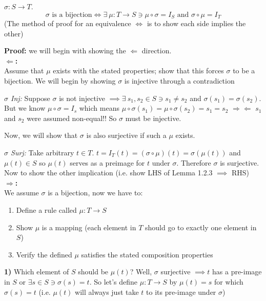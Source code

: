 \begin{lemma}
$\sigma :S \rightarrow T$.
\begin{equation}
    \sigma \text{ is a bijection} \iff \exists \ \mu: T\rightarrow S \ni \mu\circ \sigma = I_S \text{ and } \sigma\circ \mu = I_T\nonumber
\end{equation}
(The method of proof for an equivalence $\Leftrightarrow$ is to show each side implies the
other)\steezybreak

\noindent \textbf{Proof:} we will begin with showing the $\Leftarrow$ direction.\\
\textbf{$\Leftarrow$:} \\Assume that $\mu$ exists with the stated properties; show that this forces
$\sigma$ to be a bijection. We will begin by showing $\sigma$ is injective through a contradiction
\steezybreak

\noindent \textit{$\sigma$ Inj:} Suppose $\sigma$ is not injective
$\implies \exists \ s_1,s_2\in S \ni s_1\neq s_2$ and $\sigma(s_1)=\sigma(s_2)$. But we know
$\mu \circ \sigma = I_s$ which means $\mu\circ \sigma (s_1) = \mu\circ \sigma(s_2) = s_1=s_2$
$\Rightarrow\Leftarrow$ $s_1$ and $s_2$ were assumed non-equal!! So $\sigma$ must be
injective.\steezybreak

\noindent Now, we will show that $\sigma$ is also surjective if such a $\mu$ exists.\steezybreak

\noindent \textit{$\sigma$ Surj:} Take arbitrary $t\in T$.
$t= I_T(t)= (\sigma\circ\mu)(t)=\sigma(\mu(t))$ and $\mu(t)\in S$ so $\mu(t)$ serves as a preimage
for $t$ under $\sigma$. Therefore $\sigma$ is surjective. \\

\noindent Now to show the other implication (i.e. show LHS of Lemma 1.2.3 $\implies$ RHS) \\
\textbf{$\Rightarrow$:} \\ We assume $\sigma$ is a bijection, now we have to:
\begin{enumerate}
    \item Define a rule called $\mu:T\rightarrow S$
    \item Show $\mu$ is a mapping (each element in $T$ should go to exactly one element in $S$)
    \item Verify the defined $\mu$ satisfies the stated composition properties
\end{enumerate}
\textbf{1)} Which element of $S$ should be $\mu(t)$? Well, $\sigma$ surjective $\implies t$ has a
pre-image in $S$ or $\exists s\in S \ni \sigma(s)=t$. So let's define $ \mu: T\rightarrow S$ by
$\mu(t)=s$ for which $\sigma(s)=t$ (i.e. $\mu(t)$ will always just take $t$ to its pre-image under
$\sigma$)\steezybreak


\end{lemma}

